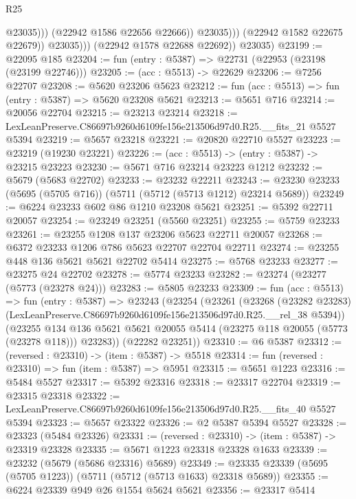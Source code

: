 \begin{lexlean}{R25}
\begin{coremodule}
                              @23035)))
                        (@22942 @1586 @22656 @22666))
                      @23035)))
                (@22942 @1582 @22675 @22679))
              @23035)))
        (@22942 @1578 @22688 @22692))
      @23035)
@23199 := @22095 @185
@23204 := fun (entry : @5387) => @22731 (@22953 (@23198 (@23199 @22746)))
@23205 := (acc : @5513) -> @22629
@23206 := @7256 @22707
@23208 := @5620 @23206 @5623
@23212 := fun (acc : @5513) => fun (entry : @5387) => @5620 @23208 @5621
@23213 := @5651 @716
@23214 := @20056 @22704
@23215 := @23213 @23214
@23218 := LexLeanPreserve.C86697b9260d6109fe156e213506d97d0.R25.__fits_21 @5527 @5394
@23219 := @5657 @23218
@23221 := @20820 @22710 @5527
@23223 := @23219 (@19230 @23221)
@23226 := (acc : @5513) -> (entry : @5387) -> @23215 @23223
@23230 := @5671 @716 @23214 @23223 @1212
@23232 := @5679 (@5683 @22702)
@23233 := @23232 @22211
@23243 := @23230 @23233 (@5695 (@5705 @716)) (@5711 (@5712 (@5713 @1212) @23214 @5689))
@23249 := @6224 @23233 @602 @86 @1210 @23208 @5621
@23251 := @5392 @22711 @20057
@23254 := @23249 @23251 (@5560 @23251)
@23255 := @5759 @23233
@23261 := @23255 @1208 @137 @23206 @5623 @22711 @20057
@23268 := @6372 @23233 @1206 @786 @5623 @22707 @22704 @22711
@23274 := @23255 @448 @136 @5621 @5621 @22702 @5414
@23275 := @5768 @23233
@23277 := @23275 @24 @22702
@23278 := @5774 @23233
@23282 := @23274 (@23277 (@5773 (@23278 @24)))
@23283 := @5805 @23233
@23309 := fun (acc : @5513) =>
  fun (entry : @5387) =>
  @23243
    (@23254
      (@23261
        (@23268
          (@23282 @23283)
          (LexLeanPreserve.C86697b9260d6109fe156e213506d97d0.R25.__rel_38 @5394))
        (@23255
          @134
          @136
          @5621
          @5621
          @20055
          @5414
          (@23275 @118 @20055 (@5773 (@23278 @118)))
          @23283))
      (@22282 @23251))
@23310 := @6 @5387
@23312 := (reversed : @23310) -> (item : @5387) -> @5518
@23314 := fun (reversed : @23310) => fun (item : @5387) => @5951
@23315 := @5651 @1223
@23316 := @5484 @5527
@23317 := @5392 @23316
@23318 := @23317 @22704
@23319 := @23315 @23318
@23322 := LexLeanPreserve.C86697b9260d6109fe156e213506d97d0.R25.__fits_40 @5527 @5394
@23323 := @5657 @23322
@23326 := @2 @5387 @5394 @5527
@23328 := @23323 (@5484 @23326)
@23331 := (reversed : @23310) -> (item : @5387) -> @23319 @23328
@23335 := @5671 @1223 @23318 @23328 @1633
@23339 := @23232 (@5679 (@5686 @23316) @5689)
@23349 := @23335 @23339 (@5695 (@5705 @1223)) (@5711 (@5712 (@5713 @1633) @23318 @5689))
@23355 := @6224 @23339 @949 @26 @1554 @5624 @5621
@23356 := @23317 @5414

\end{coremodule}
\end{lexlean}
